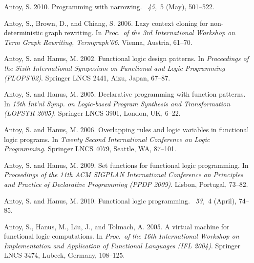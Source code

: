 \documentclass{mytlp}
\begin{document}
\begin{thebibliography}{}
{\sc Antoy, S.} 2010.
\newblock Programming with narrowing.
~{\em 45,\/}~5 (May),
  501--522.

{\sc Antoy, S.}, {\sc Brown, D.}, {\sc and} {\sc Chiang, S.} 2006.
\newblock Lazy context cloning for non-deterministic graph rewriting.
\newblock In {\em Proc.~of the 3rd International Workshop on Term Graph
  Rewriting, Termgraph'06}. Vienna, Austria, 61--70.

{\sc Antoy, S.} {\sc and} {\sc Hanus, M.} 2002.
\newblock Functional logic design patterns.
\newblock In {\em Proceedings of the Sixth International Symposium on
  Functional and Logic Programming (FLOPS'02)}. Springer LNCS 2441, Aizu,
  Japan, 67--87.

{\sc Antoy, S.} {\sc and} {\sc Hanus, M.} 2005.
\newblock Declarative programming with function patterns.
\newblock In {\em 15th Int'nl Symp. on Logic-based Program Synthesis and
  Transformation (LOPSTR 2005)}. Springer LNCS 3901, London, UK, 6--22.

{\sc Antoy, S.} {\sc and} {\sc Hanus, M.} 2006.
\newblock Overlapping rules and logic variables in functional logic programs.
\newblock In {\em Twenty Second International Conference on Logic Programming}.
  Springer LNCS 4079, Seattle, WA, 87--101.

{\sc Antoy, S.} {\sc and} {\sc Hanus, M.} 2009.
\newblock Set functions for functional logic programming.
\newblock In {\em Proceedings of the 11th ACM SIGPLAN International Conference
  on Principles and Practice of Declarative Programming (PPDP 2009)}. Lisbon,
  Portugal, 73--82.

{\sc Antoy, S.} {\sc and} {\sc Hanus, M.} 2010.
\newblock Functional logic programming.
~{\em 53,\/}~4 (April), 74--85.

{\sc Antoy, S.}, {\sc Hanus, M.}, {\sc Liu, J.}, {\sc and} {\sc Tolmach, A.}
  2005.
\newblock A virtual machine for functional logic computations.
\newblock In {\em Proc.\ of the 16th International Workshop on Implementation
  and Application of Functional Languages (IFL 2004)}. Springer LNCS 3474,
  Lubeck, Germany, 108--125.


\end{thebibliography}
\end{document}
